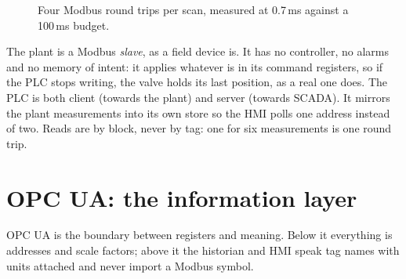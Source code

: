 \begin{figure}[htbp]
\centering
{}
\caption{Four Modbus round trips per scan, measured at 0.7\,ms against a
100\,ms budget.}
\label{fig:modbus}
\end{figure}

The plant is a Modbus \emph{slave}, as a field device is. It has no controller,
no alarms and no memory of intent: it applies whatever is in its command
registers, so if the PLC stops writing, the valve holds its last position, as
a real one does. The PLC is both client (towards the plant) and server
(towards SCADA). It mirrors the plant measurements into its own store so the
HMI polls one address instead of two. Reads are by block, never by tag: one
 for six measurements is one round trip.

\section{OPC UA: the information layer}

OPC UA is the boundary between registers and meaning. Below it everything is
addresses and scale factors; above it the historian and HMI speak tag names
with units attached and never import a Modbus symbol.

